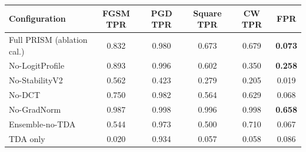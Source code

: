 %
\begin{tabular}{lccccc}
\toprule
Configuration & FGSM TPR & PGD TPR & Square TPR & CW TPR & FPR \\
\midrule
Full PRISM (ablation cal.) & 0.832 & 0.980 & 0.673 & 0.679 & \textbf{0.073} \\
\midrule
No-LogitProfile      & 0.893 & 0.996 & 0.602 & 0.350 & \textbf{0.258} \\
No-StabilityV2       & 0.562 & 0.423 & 0.279 & 0.205 & 0.019 \\
No-DCT               & 0.750 & 0.982 & 0.564 & 0.629 & 0.068 \\
No-GradNorm          & 0.987 & 0.998 & 0.996 & 0.998 & \textbf{0.658} \\
\midrule
Ensemble-no-TDA      & 0.544 & 0.973 & 0.500 & 0.710 & 0.067 \\
TDA only             & 0.020 & 0.934 & 0.057 & 0.058 & 0.086 \\
\bottomrule
\end{tabular}
